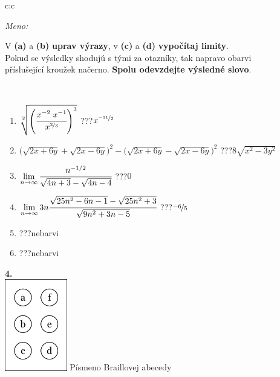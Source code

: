 \documentclass[10pt]{report}
\begin{document}
\begin{tabular}{c:c}
\begin{minipage}[c][104.5mm][t]{0.5\linewidth}
\begin{center}
\textit{Meno:}\phantom{xxxxxxxxxxxxxxxxxxxxxxxxxxxxxxxxxxxxxxxxxxxxxxxxxxxxxxxxxxxxxxxxx}\\[5mm]
\begin{minipage}{0.95\linewidth}
\begin{center}
V \textbf{(a)} a \textbf{(b)} \textbf{uprav výrazy}, v \textbf{(c)} a \textbf{(d)} \textbf{vypočítaj limity}.\\Pokud se výsledky shodujú s tými za otazníky, tak napravo obarvi\\příslušející kroužek načerno. \textbf{Spolu odevzdejte výsledné slovo}.
\end{center}
\end{minipage}
\\[1mm]
\begin{minipage}{0.79\linewidth}
\begin{center}
\begin{varwidth}{\linewidth}
\begin{enumerate}
\small
\item $\sqrt[2]{\left(\cfrac{x^{-2}\;x^{-1}}{x^{\nicefrac{2}{3}}}\right)^{3}}$\quad \dotfill\; ???\;\dotfill \quad $x^{\nicefrac{-11}{2}}$
\item {\footnotesize{\scriptsize$\big(\sqrt{2x+6y}+\sqrt{2x-6y}\big)^2-\big(\sqrt{2x+6y}-\sqrt{2x-6y}\big)^2$}\quad \dotfill\; ???\;\dotfill \quad $8\sqrt{x^2-3y^2}$}
\item $\lim\limits_{n\to\infty}\cfrac{n^{-1/2}}{\sqrt{4n+3}-\sqrt{4n-4}}$\quad \dotfill\; ???\;\dotfill \quad $0$
\item $\lim\limits_{n\to\infty}3n\cfrac{\sqrt{25n^2-6n-1}-\sqrt{25n^2+3}}{\sqrt{9n^2+3n-5}}$\quad \dotfill\; ???\;\dotfill \quad $\nicefrac{-6}{5}$
\item \quad \dotfill\; ???\;\dotfill \quad nebarvi
\item \quad \dotfill\; ???\;\dotfill \quad nebarvi
\end{enumerate}
\end{varwidth}
\end{center}
\end{minipage}
\begin{minipage}{0.20\linewidth}
\begin{center}
{\Huge\bfseries 4.} \\[2mm]
\includegraphics[height=40mm]{../images/braille.png}
{\small Písmeno Braillovej abecedy}
\end{center}
\end{minipage}
\end{center}
\end{minipage}
%
\end{tabular}
\end{document}
